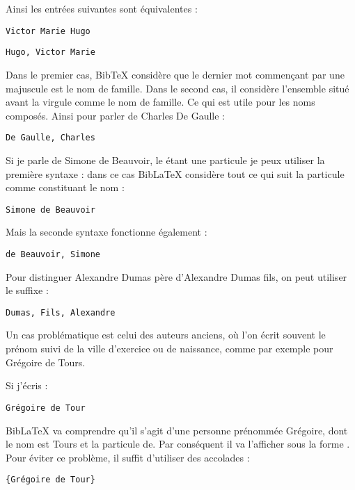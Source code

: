 Ainsi les entrées suivantes sont équivalentes :

\begin{verbatim}
Victor Marie Hugo
\end{verbatim}

\begin{verbatim}
Hugo, Victor Marie
\end{verbatim}

Dans le premier cas, BibTeX considère que le dernier mot commençant par une majuscule est le nom de famille. Dans le second cas, il considère l'ensemble situé avant la virgule comme le nom de famille. Ce qui est utile pour les noms composés. Ainsi pour parler de Charles De Gaulle :

\begin{verbatim}
De Gaulle, Charles
\end{verbatim}

Si je parle de Simone de Beauvoir, le  étant une particule je peux utiliser la première syntaxe : dans ce cas BibLaTeX considère tout ce qui suit la particule comme constituant le nom :

\begin{verbatim}
Simone de Beauvoir
\end{verbatim}

Mais la seconde syntaxe fonctionne également :

\begin{verbatim}
de Beauvoir, Simone
\end{verbatim}

Pour distinguer Alexandre Dumas père d'Alexandre Dumas fils, on peut utiliser le suffixe :

\begin{verbatim}
Dumas, Fils, Alexandre
\end{verbatim}

Un cas problématique est celui des auteurs anciens, où l'on écrit souvent le prénom suivi de la ville d'exercice ou de naissance, comme par exemple pour Grégoire de Tours.

Si j'écris : 

\begin{verbatim}
Grégoire de Tour
\end{verbatim}

BibLaTeX va comprendre qu'il s'agit d'une personne prénommée Grégoire, dont le nom est Tours et la particule de. Par conséquent il va l'afficher sous la forme . Pour éviter ce problème, il suffit d'utiliser des accolades :
\begin{verbatim}
{Grégoire de Tour}
\end{verbatim}

